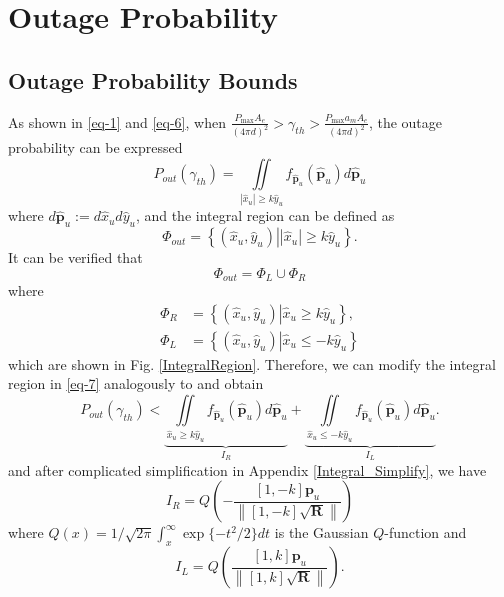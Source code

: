 \documentclass{IEEEtran}
\begin{document}
\section{Outage Probability}
\subsection{Outage Probability Bounds}
As shown in \eqref{eq-1} and \eqref{eq-6}, when $\frac{{{P_{\max }}{A_e}}}{{{{\left( {4\pi d} \right)}^2}}} > {\gamma _{th}} > \frac{{{P_{\max }}{a_m}{A_e}}}{{{{\left( {4\pi d} \right)}^2}}}$, the outage probability can be expressed
\begin{equation}\label{eq-7}
{P_{out}}\left( {{\gamma _{th}}} \right) = \iint\limits_{\left| {{{\hat x}_u}} \right| \ge k{{\hat y}_u}} {f_{\hat{ \textbf{p}}_u}}\left(\hat{ \textbf{p}}_u \right) d{\hat{ \textbf{p}}_u}
\end{equation}
where $d\hat{ \textbf{p}}_u:=d \hat x_u d \hat y_u$, and the integral region can be defined as
\begin{equation}\label{eq-8}
  {\Phi _{out}} = \left\{ {\left. {\left( {{{\hat x}_u},{{\hat y}_u}} \right)} \right|\left| {{{\hat x}_u}} \right| \ge k{{\hat y}_u}} \right\}.
\end{equation}
It can be verified that
\begin{equation}\label{eq-9}
  {\Phi _{out}} = {\Phi _L} \cup {\Phi _R}
\end{equation}
where
\begin{equation}\label{eq-10}
\begin{split}
{\Phi _R} &= \left\{ {\left. {\left( {{{\hat x}_u},{{\hat y}_u}} \right)} \right|{{\hat x}_u} \ge k{{\hat y}_u}} \right\},\\
{\Phi _L} &= \left\{ {\left. {\left( {{{\hat x}_u},{{\hat y}_u}} \right)} \right|{{\hat x}_u} \le  - k{{\hat y}_u}} \right\}
\end{split}
\end{equation}
which are shown in Fig. \ref{IntegralRegion}. Therefore, we can modify the integral region in \eqref{eq-7} analogously to \cite{RightTail_SLN_GC} and obtain
\begin{equation}\label{eq-11}
{P_{out}}\left( {{\gamma _{th}}} \right) < \underbrace {\iint\limits_{{{\hat x}_u} \ge k{{\hat y}_u}} {{f_{\hat{ \textbf{p}}_u}}\left( \hat{ \textbf{p}}_u \right)d{\hat{ \textbf{p}}_u}} }_{{I_R}} + \underbrace {\iint\limits_{{{\hat x}_u} \le  - k{{\hat y}_u}} {{f_{\hat{ \textbf{p}}_u}}\left( {{\hat{ \textbf{p}}_u}} \right)d\hat{ \textbf{p}}_u} }_{{I_L}}.
\end{equation}
and after complicated simplification in Appendix \ref{Integral_Simplify}, we have
\begin{equation}\label{eq-12}
{I_R} = Q\left( { - \frac{{\left[ {1, - k} \right]{{\textbf{p}}_u}}}{{\left\| {\left[ {1, - k} \right]\sqrt {\textbf{R}} } \right\|}}} \right)
\end{equation}
where $Q(x)=1/\sqrt{2\pi}\int_{x}^{\infty}\exp\{-t^2/2\}dt$ is the Gaussian $Q$-function and
\begin{equation}\label{eq-13}
{I_L} = Q\left( {\frac{{\left[ {1,k} \right]{{\textbf{p}}_u}}}{{\left\| {\left[ {1,k} \right]\sqrt {\textbf{R}} } \right\|}}} \right).
\end{equation}
\end{document}
